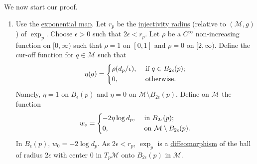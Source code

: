 We now start our proof.
\begin{enumerate}[2.]
	\item Use the \hyperref[def:exponential-map]{exponential map}. Let \(r_p\) be the \hyperref[def:injectivity-radius]{injectivity radius} (relative to \((\mathcal{M} , g)\)) of \(\exp _p\). Choose \(\epsilon >0\) such that \(2 \epsilon < r_p\). Let \(\rho \) be a \(C^{\infty} \) non-increasing function on \([0, \infty )\) such that \(\rho = 1\) on \([0, 1]\) and \(\rho = 0\) on \([2, \infty )\). Define the cur-off function for \(q\in \mathcal{M} \) such that
	      \[
		      \eta (q) = \begin{dcases}
			      \rho (d_p / \epsilon ), & \text{ if } q \in B_{2\epsilon }(p) ; \\
			      0,                      & \text{ otherwise} .
		      \end{dcases}
	      \]
	      Namely, \(\eta = 1\) on \(B_{\epsilon } (p)\) and \(\eta = 0\) on \(\mathcal{M} \setminus B_{2\epsilon }(p)\). Define on \(\mathcal{M} \) the function
	      \[
		      w_o = \begin{dcases}
			      -2 \eta \log d_p, & \text{ in } B_{2\epsilon }(p)  ;                       \\
			      0,                & \text{ on } \mathcal{M} \setminus B_{2\epsilon }(p)  .
		      \end{dcases}
	      \]
	      In \(B_{\epsilon } (p)\), \(w_0 = - 2 \log d_p\). As \(2\epsilon < r_p\), \(\exp _p\) is a \hyperref[def:diffeomorphism]{diffeomorphism} of the ball of radius \(2\epsilon \) with center \(0\) in \(T_p \mathcal{M} \) onto \(B_{2\epsilon } (p)\) in \(\mathcal{M} \).
\end{enumerate}